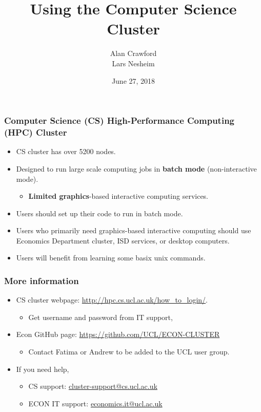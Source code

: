 \documentclass{beamer}
\title{Using the Computer Science Cluster}
\author{Alan Crawford \\
           Lars Nesheim}
\date{June 27, 2018}
\begin{document}
\lstset{language=Pascal}
\frame{\titlepage}


\begin{frame}
\frametitle{Computer Science (CS) High-Performance Computing (HPC) Cluster}

\begin{itemize}
\item CS cluster has over 5200 nodes.
\item Designed to run large scale computing jobs in \textbf{batch mode} (non-interactive mode).
\begin{itemize}
\item \textbf{Limited graphics}-based interactive computing services. 
\end{itemize}
\item Users should set up their code to run in batch mode.
\item Users who primarily need graphics-based interactive computing should use Economics Department cluster, ISD services, or desktop computers.
\item Users will benefit from learning some basix unix commands. 
\end{itemize}
\end{frame}

\begin{frame}
\frametitle{More information}
\begin{itemize}
\item CS cluster webpage: \textcolor{blue}{\url{http://hpc.cs.ucl.ac.uk/how_to_login/}}.
\begin{itemize}
\item Get username and password from IT support,
\end{itemize}
\item Econ GitHub page: \textcolor{blue}{\url{https://github.com/UCL/ECON-CLUSTER}}
\begin{itemize}
\item Contact Fatima or Andrew to be added to the UCL user group.
\end{itemize}
\item If you need help, 
\begin{itemize}
\item CS support: \textcolor{blue}{\url{cluster-support@cs.ucl.ac.uk}}
\item ECON IT support:  \textcolor{blue}{\url{economics.it@ucl.ac.uk}}
\end{itemize}
\end{itemize}
\end{frame}
\end{document}
